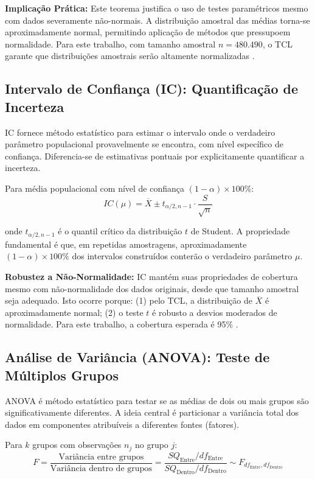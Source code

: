 \documentclass[12pt,a4paper]{article}
\begin{document}
\textbf{Implicação Prática:} Este teorema justifica o uso de testes paramétricos mesmo com dados severamente não-normais. A distribuição amostral das médias torna-se aproximadamente normal, permitindo aplicação de métodos que pressupoem normalidade. Para este trabalho, com tamanho amostral $n = 480.490$, o TCL garante que distribuições amostrais serão altamente normalizadas \cite{Montgomery2013, Devore2015}.

\subsection{Intervalo de Confiança (IC): Quantificação de Incerteza}

IC fornece método estatístico para estimar o intervalo onde o verdadeiro parâmetro populacional provavelmente se encontra, com nível específico de confiança. Diferencia-se de estimativas pontuais por explicitamente quantificar a incerteza.

Para média populacional com nível de confiança $(1-\alpha) \times 100\%$:
\begin{equation}
IC(\mu) = \overline{X} \pm t_{\alpha/2,n-1} \cdot \frac{S}{\sqrt{n}}
\end{equation}

onde $t_{\alpha/2,n-1}$ é o quantil crítico da distribuição $t$ de Student. A propriedade fundamental é que, em repetidas amostragens, aproximadamente $(1-\alpha) \times 100\%$ dos intervalos construídos conterão o verdadeiro parâmetro $\mu$.

\textbf{Robustez a Não-Normalidade:} IC mantém suas propriedades de cobertura mesmo com não-normalidade dos dados originais, desde que tamanho amostral seja adequado. Isto ocorre porque: (1) pelo TCL, a distribuição de $\overline{X}$ é aproximadamente normal; (2) o teste $t$ é robusto a desvios moderados de normalidade. Para este trabalho, a cobertura esperada é 95\% \cite{Montgomery2013, Devore2015}.

\subsection{Análise de Variância (ANOVA): Teste de Múltiplos Grupos}

ANOVA é método estatístico para testar se as médias de dois ou mais grupos são significativamente diferentes. A ideia central é particionar a variância total dos dados em componentes atribuíveis a diferentes fontes (fatores).

Para $k$ grupos com observações $n_j$ no grupo $j$:
\begin{equation}
F = \frac{\text{Variância entre grupos}}{\text{Variância dentro de grupos}} = \frac{SQ_{\text{Entre}}/df_{\text{Entre}}}{SQ_{\text{Dentro}}/df_{\text{Dentro}}} \sim F_{df_{\text{Entre}}, df_{\text{Dentro}}}
\end{equation}
\end{document}
